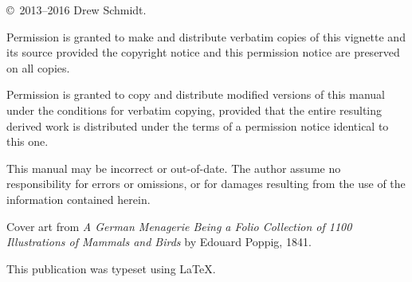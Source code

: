 \null
\vfill
\copyright\ 2013--2016 Drew Schmidt.

Permission is granted to make and distribute verbatim copies of
this vignette and its source provided the copyright notice and
this permission notice are preserved on all copies.

Permission is granted to copy and distribute modified versions of this manual under the conditions for verbatim copying, provided that the entire resulting derived work is distributed under the terms of a permission notice identical to this one. 

This manual may be incorrect or out-of-date.  The author assume
no responsibility for errors or omissions, or for damages resulting
from the use of the information contained herein.

Cover art from \emph{A German Menagerie Being a Folio Collection of 1100 Illustrations of Mammals and Birds} by Edouard Poppig, 1841.

This publication was typeset using \LaTeX.
